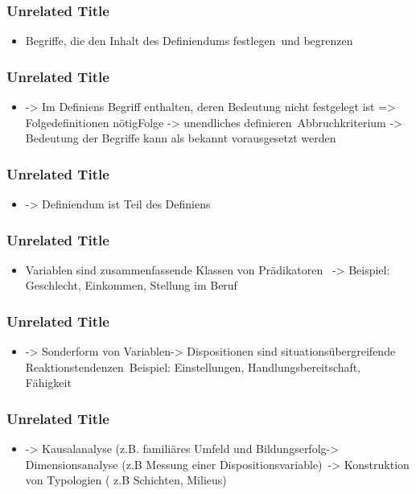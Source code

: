 \documentclass[
    11pt,
    aspectratio=169,
]{beamer}
\begin{document}
\begin{frame}
\frametitle{Unrelated Title}


\begin{itemize}
\item Begriffe, die den Inhalt des Definiendums festlegen und begrenzen
\end{itemize}

\note[item]{}
\end{frame}
\begin{frame}
\frametitle{Unrelated Title}


\begin{itemize}
\item -> Im Definiens Begriff enthalten, deren Bedeutung nicht festgelegt ist => Folgedefinitionen nötigFolge -> unendliches definieren Abbruchkriterium -> Bedeutung der Begriffe kann als bekannt vorausgesetzt werden
\end{itemize}

\note[item]{}
\end{frame}
\begin{frame}
\frametitle{Unrelated Title}


\begin{itemize}
\item -> Definiendum ist Teil des Definiens 
\end{itemize}

\note[item]{}
\end{frame}
\begin{frame}
\frametitle{Unrelated Title}


\begin{itemize}
\item Variablen sind zusammenfassende Klassen von Prädikatoren  -> Beispiel: Geschlecht, Einkommen, Stellung im Beruf 
\end{itemize}

\note[item]{}
\end{frame}
\begin{frame}
\frametitle{Unrelated Title}


\begin{itemize}
\item -> Sonderform von Variablen-> Dispositionen sind situationsübergreifende Reaktionstendenzen Beispiel: Einstellungen, Handlungsbereitschaft, Fähigkeit 
\end{itemize}

\note[item]{}
\end{frame}
\begin{frame}
\frametitle{Unrelated Title}


\begin{itemize}
\item -> Kausalanalyse (z.B. familiäres Umfeld und Bildungserfolg-> Dimensionsanalyse (z.B Messung einer Dispositionsvariable) -> Konstruktion von Typologien ( z.B Schichten, Milieus) 
\end{itemize}

\note[item]{}
\end{frame}
\end{document}
